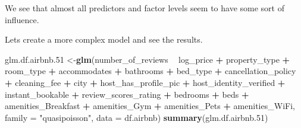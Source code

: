\documentclass[
]{article}
\newenvironment{Shaded}{\begin{snugshade}}{\end{snugshade}}
\newcommand{\DataTypeTok}[1]{\textcolor[rgb]{0.13,0.29,0.53}{#1}}
\newcommand{\FloatTok}[1]{\textcolor[rgb]{0.00,0.00,0.81}{#1}}
\newcommand{\KeywordTok}[1]{\textcolor[rgb]{0.13,0.29,0.53}{\textbf{#1}}}
\newcommand{\NormalTok}[1]{#1}
\newcommand{\OperatorTok}[1]{\textcolor[rgb]{0.81,0.36,0.00}{\textbf{#1}}}
\newcommand{\StringTok}[1]{\textcolor[rgb]{0.31,0.60,0.02}{#1}}
\begin{document}
We see that almost all predictors and factor levels seem to have some
sort of influence.

Lets create a more complex model and see the results.

\begin{Shaded}
\begin{Highlighting}[]
\NormalTok{glm.df.airbnb}\FloatTok{.51}\NormalTok{ <-}\KeywordTok{glm}\NormalTok{(number_of_reviews }\OperatorTok{~}\StringTok{ }\NormalTok{log_price }\OperatorTok{+}\StringTok{ }\NormalTok{property_type }\OperatorTok{+}\StringTok{ }\NormalTok{room_type }\OperatorTok{+}
\StringTok{                         }\NormalTok{accommodates }\OperatorTok{+}\StringTok{ }\NormalTok{bathrooms }\OperatorTok{+}\StringTok{ }\NormalTok{bed_type }\OperatorTok{+}\StringTok{ }\NormalTok{cancellation_policy }\OperatorTok{+}
\StringTok{                         }\NormalTok{cleaning_fee }\OperatorTok{+}\StringTok{ }\NormalTok{city }\OperatorTok{+}\StringTok{ }\NormalTok{host_has_profile_pic }\OperatorTok{+}
\StringTok{                         }\NormalTok{host_identity_verified }\OperatorTok{+}\StringTok{ }\NormalTok{instant_bookable }\OperatorTok{+}
\StringTok{                         }\NormalTok{review_scores_rating }\OperatorTok{+}\StringTok{ }\NormalTok{bedrooms }\OperatorTok{+}\StringTok{ }\NormalTok{beds }\OperatorTok{+}\StringTok{ }\NormalTok{amenities_Breakfast }\OperatorTok{+}
\StringTok{                         }\NormalTok{amenities_Gym }\OperatorTok{+}\StringTok{ }\NormalTok{amenities_Pets }\OperatorTok{+}\StringTok{ }\NormalTok{amenities_WiFi,}
                        \DataTypeTok{family =} \StringTok{"quasipoisson"}\NormalTok{,}
                        \DataTypeTok{data =}\NormalTok{ df.airbnb)}
\KeywordTok{summary}\NormalTok{(glm.df.airbnb}\FloatTok{.51}\NormalTok{)}
\end{Highlighting}
\end{Shaded}
\end{document}

